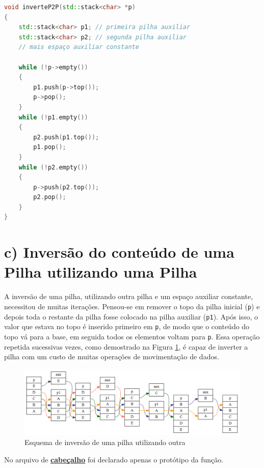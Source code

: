 \documentclass[
  brazilian,
  paper=a4,
  oneside  ,captions=tableheading
]{scrbook}
\newcommand{\passthrough}[1]{#1}
\begin{document}
\begin{lstlisting}[language={C++}]
void inverteP2P(std::stack<char> *p)
{
    std::stack<char> p1; // primeira pilha auxiliar
    std::stack<char> p2; // segunda pilha auxiliar
    // mais espaço auxiliar constante

    while (!p->empty())
    {
        p1.push(p->top());
        p->pop();
    }
    while (!p1.empty())
    {
        p2.push(p1.top());
        p1.pop();
    }
    while (!p2.empty())
    {
        p->push(p2.top());
        p2.pop();
    }
}
\end{lstlisting}

\hypertarget{c-inversuxe3o-do-conteuxfado-de-uma-pilha-utilizando-uma-pilha}{%
\section{c) Inversão do conteúdo de uma Pilha utilizando uma
Pilha}\label{c-inversuxe3o-do-conteuxfado-de-uma-pilha-utilizando-uma-pilha}}

A inversão de uma pilha, utilizando outra pilha e um espaço auxiliar
constante, necessitou de muitas iterações. Pensou-se em remover o topo
da pilha inicial (\passthrough{\lstinline!p!}) e depois toda o restante
da pilha fosse colocado na pilha auxiliar
(\passthrough{\lstinline!p1!}). Após isso, o valor que estava no topo é
inserido primeiro em \passthrough{\lstinline!p!}, de modo que o conteúdo
do topo vá para a base, em seguida todos os elementos voltam para
\passthrough{\lstinline!p!}. Essa operação repetida sucessivas vezes,
como demostrado na Figura \ref{Fig:1}, é capaz de inverter a pilha com
um custo de muitas operações de movimentação de dados.

\begin{figure}
\hypertarget{Fig:1}{%
\centering
\includegraphics{inverteP1P.png}
\caption{Esquema de inversão de uma pilha utilizando outra}\label{Fig:1}
}
\end{figure}

No arquivo de
\href{https://github.com/ecostadelle/lista_pilhas_filas/blob/main/include/inverteP1P.hpp}{\textbf{cabeçalho}}
foi declarado apenas o protótipo da função.
\end{document}
